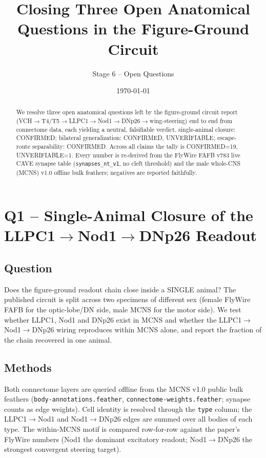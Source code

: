 \documentclass[11pt]{article}
\title{Closing Three Open Anatomical Questions in the Figure-Ground Circuit}
\author{Stage 6 -- Open Questions}
\date{\today}
\begin{document}
\maketitle

\begin{abstract}
We resolve three open anatomical questions left by the figure-ground circuit report (VCH$\rightarrow$T4/T5$\rightarrow$LLPC1$\rightarrow$Nod1$\rightarrow$DNp26$\rightarrow$wing-steering) end to end from connectome data, each yielding a neutral, falsifiable verdict. single-animal closure: CONFIRMED; bilateral generalization: CONFIRMED, UNVERIFIABLE; escape-route separability: CONFIRMED. Across all claims the tally is CONFIRMED=19, UNVERIFIABLE=1. Every number is re-derived from the FlyWire FAFB v783 live CAVE synapse table (\texttt{synapses\_nt\_v1}, no cleft threshold) and the male whole-CNS (MCNS) v1.0 offline bulk feathers; negatives are reported faithfully.
\end{abstract}

\section{Q1 -- Single-Animal Closure of the LLPC1$\rightarrow$Nod1$\rightarrow$DNp26 Readout}

\subsection*{Question}
Does the figure-ground readout chain close inside a SINGLE animal? The published circuit is split across two specimens of different sex (female FlyWire FAFB for the optic-lobe/DN side, male MCNS for the motor side). We test whether LLPC1, Nod1 and DNp26 exist in MCNS and whether the LLPC1$\rightarrow$Nod1$\rightarrow$DNp26 wiring reproduces within MCNS alone, and report the fraction of the chain recovered in one animal.

\subsection*{Methods}
Both connectome layers are queried offline from the MCNS v1.0 public bulk feathers (\texttt{body-annotations.feather}, \texttt{connectome-weights.feather}; synapse counts as edge weights). Cell identity is resolved through the \texttt{type} column; the LLPC1$\rightarrow$Nod1 and Nod1$\rightarrow$DNp26 edges are summed over all bodies of each type. The within-MCNS motif is compared row-for-row against the paper's FlyWire numbers (Nod1 the dominant excitatory readout; Nod1$\rightarrow$DNp26 the strongest convergent steering target).
\end{document}
